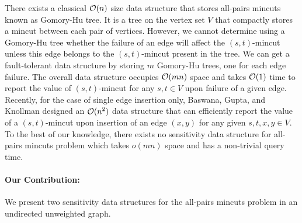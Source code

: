 There exists a classical ${\cal O}(n)$ size data structure that stores all-pairs mincuts \cite{GH61} known as Gomory-Hu tree. It is a tree on the vertex set $V$ that compactly stores a mincut between each pair of vertices. However, we cannot determine using a Gomory-Hu tree whether the failure of an edge will affect the $(s,t)$-mincut unless this edge belongs to the $(s,t)$-mincut present in the tree. We can get a fault-tolerant data structure by storing $m$ Gomory-Hu trees, one for each edge failure. The overall data structure occupies ${\cal O}(mn)$ space and takes ${\cal O}(1)$ time to report the value of $(s,t)$-mincut for any $s,t\in V$ upon failure of a given edge. 
Recently, for the case of single edge insertion only, Baswana, Gupta, and Knollman \cite{DBLP:conf/esa/BaswanaGK20} designed an ${\cal O}(n^2)$ data structure that can efficiently report the value of a $(s,t)$-mincut upon insertion of an edge $(x,y)$ for any given $s,t,x,y \in V$.  To the best of our knowledge, there exists no sensitivity data structure for all-pairs mincuts problem which takes $o(mn)$ space and has a non-trivial query time.


\paragraph{Our Contribution:} We present two sensitivity data structures for the all-pairs mincuts problem in an undirected unweighted graph.

